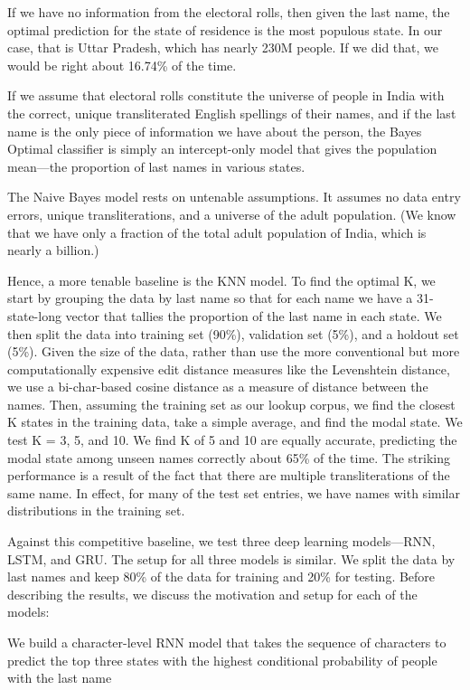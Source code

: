 \documentclass[11pt,  letterpaper]{article}
\begin{document}
If we have no information from the electoral rolls, then given the last name, the optimal prediction for the state of residence is the most populous state. In our case, that is Uttar Pradesh, which has nearly 230M people. If we did that, we would be right about 16.74\% of the time.

If we assume that electoral rolls constitute the universe of people in India with the correct, unique transliterated English spellings of their names, and if the last name is the only piece of information we have about the person, the Bayes Optimal classifier is simply an intercept-only model that gives the population mean---the proportion of last names in various states. 

The Naive Bayes model rests on untenable assumptions. It assumes no data entry errors, unique transliterations, and a universe of the adult population. (We know that we have only a fraction of the total adult population of India, which is nearly a billion.) 

Hence, a more tenable baseline is the KNN model. To find the optimal K, we start by grouping the data by last name so that for each name we have a 31-state-long vector that tallies the proportion of the last name in each state. We then split the data into training set (90\%), validation set (5\%), and a holdout set (5\%). Given the size of the data, rather than use the more conventional but more computationally expensive edit distance measures like the Levenshtein distance, we use a bi-char-based cosine distance as a measure of distance between the names. Then, assuming the training set as our lookup corpus, we find the closest K states in the training data, take a simple average, and find the modal state. We test K = 3, 5, and 10. We find K of 5 and 10 are equally accurate, predicting the modal state among unseen names correctly about 65\% of the time. The striking performance is a result of the fact that there are multiple transliterations of the same name. In effect, for many of the test set entries, we have names with similar distributions in the training set. 

Against this competitive baseline, we test three deep learning models---RNN, LSTM, and GRU. The setup for all three models is similar. We split the data by last names and keep 80\% of the data for training and 20\% for testing. Before describing the results, we discuss the motivation and setup for each of the models:  

We build a character-level RNN model that takes the sequence of characters to predict the top three states with the highest conditional probability of people with the last name 
\end{document}
